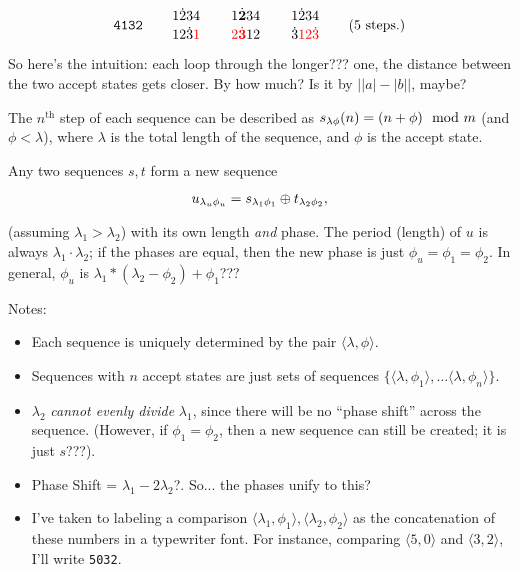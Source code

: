 \documentclass{article}
\begin{document}
\[
  \texttt{4132} \qquad
  \SeqCompare{1\dot{2}34}{12\dot{3}\textcolor{red}{1}} \qquad
  \SeqCompare{1\dot{\mathbf{2}}34}{\textcolor{red}{2\dot{\mathbf{3}}}12} \qquad
  \SeqCompare{1\dot{2}34}{\dot{3}\textcolor{red}{12\dot{3}}} \qquad
  \text{(5 steps.)}
\]


So here's the intuition: each loop through the longer??? one, the distance between the two accept states gets closer. By how much? Is it by $\big| |a| - |b| \big|$, maybe?



The $n^\text{th}$ step of each sequence can be described as $\Seq{s}(n) = (n +
\phi) \mod m$ (and $\phi < \lambda$), where $\lambda$ is the total length of the
sequence, and $\phi$ is the accept state.



Any two sequences $s, t$ form a new sequence

\[
  \Seqn{u}{u} = \Seqn{s}{1} \oplus \Seqn{t}{2},
\]

(assuming $\lambda_1 > \lambda_2$) with its own length \emph{and} phase. The
period (length) of $u$ is always $\lambda_1 \cdot \lambda_2$; if the phases are
equal, then the new phase is just $\phi_u = \phi_1 = \phi_2$. In general,
$\phi_u$ is $\lambda_1 * (\lambda_2 - \phi_2) + \phi_1$???

Notes:
\begin{itemize}
  \item Each sequence is uniquely determined by the pair $\langle \lambda, \phi \rangle$.
  \item Sequences with $n$ accept states are just sets of sequences $\{ \langle \lambda, \phi_1 \rangle, \dots \langle \lambda, \phi_n \rangle \}$.
  \item $\lambda_2$ \emph{cannot evenly divide} $\lambda_1$, since there will be no ``phase shift'' across the sequence. (However, if $\phi_1 = \phi_2$, then a new sequence can still be created; it is just $s$???).
  \item Phase Shift = $\lambda_1 - 2\lambda_2$?. So... the phases unify to this?
  \item I've taken to labeling a comparison $\langle \lambda_1, \phi_1 \rangle, \langle \lambda_2, \phi_2 \rangle$ as the concatenation of these numbers in a typewriter font. For instance, comparing $\langle 5, 0 \rangle$ and $\langle 3, 2 \rangle$, I'll write \texttt{5032}.
\end{itemize}
\end{document}
